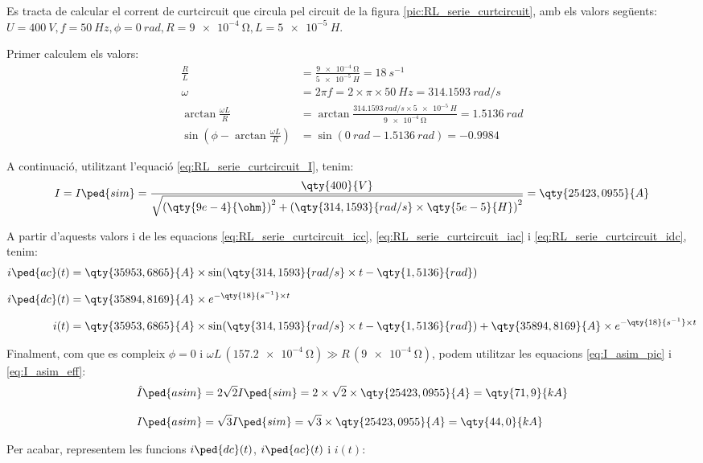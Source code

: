 \begin{exemple}\label{ex:CurtcircuitRL}
	\addcontentsxms{\CurtcircuitRL}		
    Es tracta de calcular el corrent de curtcircuit que circula pel circuit de la figura \vref{pic:RL_serie_curtcircuit}, amb els valors següents: $U=\qty{400}{V}, f=\qty{50}{Hz}, \phi=\qty{0}{rad}, R=\qty{9e-4}{\ohm}, L=\qty{5e-5}{H}$.

    Primer calculem els valors:
    \begin{align*}
    	\frac{R}{L} &= \frac{\qty{9e-4}{\ohm}}{\qty{5e-5}{H}} = \qty{18}{s^{-1}} \\[3mm]
        \omega &= 2\pi f = 2\times\pi\times\qty{50}{Hz} = \qty{314,1593}{rad/s} \\[3mm]
        \arctan\frac{\omega L}{R} &= \arctan\frac{\qty{314,1593}{rad/s}\times\qty{5e-5}{H}}{\qty{9e-4}{\ohm}} =
        \qty{1,5136}{rad}\\[3mm]
        \sin\left(\phi - \arctan\frac{\omega L}{R}\right) &= \sin(\qty{0}{rad} - \qty{1,5136}{rad})= \num{-0,9984}
    \end{align*}


    A continuació, utilitzant l'equació \eqref{eq:RL_serie_curtcircuit_I}, tenim:
    \[
        I= I\ped{sim} =\frac{\qty{400}{V}}{\sqrt{\left(\qty{9e-4}{\ohm}\right)^2+\left(\qty{314,1593}{rad/s}\times \qty{5e-5}{H}\right)^2}} =
        \qty{25423,0955}{A}
    \]

      A partir d'aquests valors i de les equacions \eqref{eq:RL_serie_curtcircuit_icc}, \eqref{eq:RL_serie_curtcircuit_iac} i \eqref{eq:RL_serie_curtcircuit_idc}, tenim:
    \begin{align*}
        i\ped{ac}(t) &= \qty{35953,6865}{A} \times \sin(\qty{314,1593}{rad/s} \times t - \qty{1,5136}{rad}) \\[0.2cm]
        i\ped{dc}(t) &= \qty{35894,8169}{A} \times e^{-\qty{18}{s^{-1}} \times t}\\[0.2cm]
        i(t) &= \qty{35953,6865}{A} \times \sin(\qty{314,1593}{rad/s} \times t - \qty{1,5136}{rad}) + \qty{35894,8169}{A} \times e^{-\qty{18}{s^{-1}} \times  t}
    \end{align*}

    Finalment, com que es compleix $\phi=0$ i $\omega L \,(\qty{157,2e-4}{\ohm}) \gg R\, (\qty{9e-4}{\ohm}) $, podem utilitzar les equacions \eqref{eq:I_asim_pic} i \eqref{eq:I_asim_eff}:
    \begin{align*}
        \hat{I}\ped{asim} &= 2 \sqrt{2} I\ped{sim}= 2 \times \sqrt{2} \times \qty{25423,0955}{A} = \qty{71,9}{kA}\\[0.3cm]
        I\ped{asim} &= \sqrt{3} I\ped{sim}= \sqrt{3} \times \qty{25423,0955}{A} = \qty{44,0}{kA}
    \end{align*}

    Per acabar, representem les funcions $i\ped{dc}(t)$, $i\ped{ac}(t)$ i $i(t)$:
    \begin{center}
        
    \end{center}
\end{exemple}


